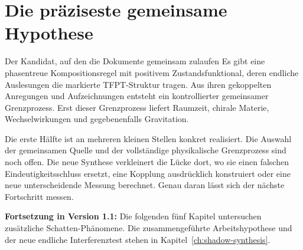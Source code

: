 \section{Die präziseste gemeinsame Hypothese}
\begin{bild}{Der Kandidat, auf den die Dokumente gemeinsam zulaufen}
Es gibt eine phasentreue Kompositionsregel mit positivem Zustandsfunktional, deren endliche Auslesungen die markierte TFPT-Struktur tragen. Aus ihren gekoppelten Anregungen und Aufzeichnungen entsteht ein kontrollierter gemeinsamer Grenzprozess. Erst dieser Grenzprozess liefert Raumzeit, chirale Materie, Wechselwirkungen und gegebenenfalls Gravitation.
\end{bild}
Die erste Hälfte ist an mehreren kleinen Stellen konkret realisiert. Die Auswahl der gemeinsamen Quelle und der vollständige physikalische Grenzprozess sind noch offen. Die neue Synthese verkleinert die Lücke dort, wo sie einen falschen Eindeutigkeitsschluss ersetzt, eine Kopplung ausdrücklich konstruiert oder eine neue unterscheidende Messung berechnet. Genau daran lässt sich der nächste Fortschritt messen.

\par\noindent\textbf{Fortsetzung in Version 1.1:} Die folgenden fünf Kapitel untersuchen zusätzliche Schatten-Phänomene. Die zusammengeführte Arbeitshypothese und der neue endliche Interferenztest stehen in Kapitel~\ref{ch:shadow-synthesis}.
